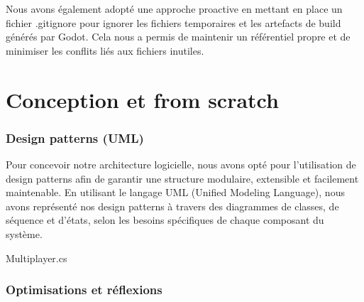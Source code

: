 \documentclass[
	article,			%
	11pt,				%
	oneside,			%
	a4paper,			%
	chapter=TITLE,
	french,			%
	sumario=tradicional
	]{base_nt}
\begin{document}
Nous avons également adopté une approche proactive en mettant en place un fichier .gitignore pour ignorer les fichiers temporaires et les artefacts de build générés par Godot. Cela nous a permis de maintenir un référentiel propre et de minimiser les conflits liés aux fichiers inutiles.

\part{Conception et from scratch}

\section{Design patterns (UML)}

Pour concevoir notre architecture logicielle, nous avons opté pour l'utilisation de design patterns afin de garantir une structure modulaire, extensible et facilement maintenable. En utilisant le langage UML (Unified Modeling Language), nous avons représenté nos design patterns à travers des diagrammes de classes, de séquence et d'états, selon les besoins spécifiques de chaque composant du système.

Multiplayer.cs


\section{Optimisations et réflexions}
\end{document}
